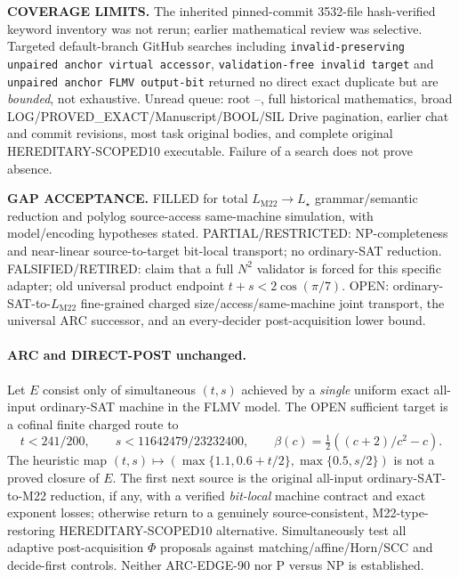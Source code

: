\documentclass[11pt]{article}
\newcommand{\LM}{L_{\mathrm{M22}}}
\newcommand{\LS}{L_\star}
\begin{document}
\noindent\textbf{COVERAGE LIMITS.} The inherited pinned-commit 3532-file hash-verified keyword inventory was not rerun; earlier mathematical review was selective. Targeted default-branch GitHub searches including \texttt{invalid-preserving unpaired anchor virtual accessor}, \texttt{validation-free invalid target} and \texttt{unpaired anchor FLMV output-bit} returned no direct exact duplicate but are \emph{bounded}, not exhaustive. Unread queue: root --,  full historical mathematics, broad LOG/PROVED\_EXACT/Manuscript/BOOL/SIL Drive pagination, earlier chat and commit revisions, most task original bodies, and complete original HEREDITARY-SCOPED10 executable. Failure of a search does not prove absence.

\noindent\textbf{GAP ACCEPTANCE.} FILLED for total \(\LM\to\LS\) grammar/semantic reduction and polylog source-access same-machine simulation, with model/encoding hypotheses stated. PARTIAL/RESTRICTED: NP-completeness and near-linear source-to-target bit-local transport; no ordinary-SAT reduction. FALSIFIED/RETIRED: claim that a full \(N^2\) validator is forced for this specific adapter; old universal product endpoint \(t+s<2\cos(\pi/7)\). OPEN: ordinary-SAT-to-\(\LM\) fine-grained charged size/access/same-machine joint transport, the universal ARC successor, and an every-decider post-acquisition lower bound.

\paragraph{ARC and DIRECT-POST unchanged.} Let \(E\) consist only of simultaneous \((t,s)\) achieved by a \emph{single} uniform exact all-input ordinary-SAT machine in the FLMV model. The OPEN sufficient target is a cofinal finite charged route to
\[
\boxed{t<241/200,\qquad s<11642479/23232400,\qquad \beta(c)=\tfrac12((c+2)/c^2-c).}
\]
The heuristic map \((t,s)\mapsto(\max\{1.1,0.6+t/2\},\max\{0.5,s/2\})\) is not a proved closure of \(E\). The first next source is the original all-input ordinary-SAT-to-M22 reduction, if any, with a verified \emph{bit-local} machine contract and exact exponent losses; otherwise return to a genuinely source-consistent, M22-type-restoring HEREDITARY-SCOPED10 alternative. Simultaneously test all adaptive post-acquisition \(\Phi\) proposals against matching/affine/Horn/SCC and decide-first controls. Neither ARC-EDGE-90 nor P versus NP is established.
\end{document}
